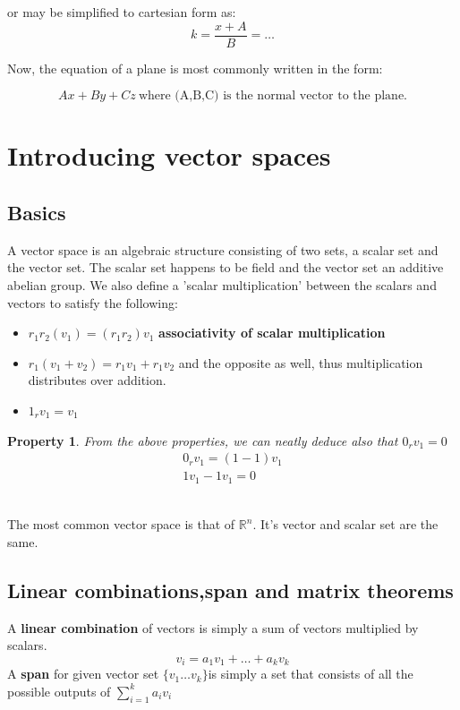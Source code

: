 \documentclass{article}
\newtheorem{property}{Property}
\begin{document}
or may be simplified to cartesian form as: 
\begin{equation*}
    k = \frac{x + A}{B} = \ldots
\end{equation*}

Now, the equation of a plane is most commonly written in the form: 

\begin{equation*}
    Ax + By + Cz \ \text{where (A,B,C) is the normal vector to the plane.}
\end{equation*}

\section{Introducing vector spaces}
\subsection{Basics}
A vector space is an algebraic structure consisting of two sets, a scalar set and the vector set. The scalar set happens to be field and the vector set an additive abelian group. We also define a 'scalar multiplication' between the scalars and vectors to satisfy the following:

\begin{itemize}
    \item $r_{1}r_{2}(v_{1}) = (r_{1}r_{2})v_{1}$  \textbf{associativity of scalar multiplication}
    \item $r_{1}(v_{1}+v_{2}) = r_{1}v_{1}+ r_{1}v_{2}$ and the opposite as well, thus multiplication distributes over addition.
    \item $1_{r}v_{1} = v_{1}$
\end{itemize}

\begin{property}
From the above properties, we can neatly deduce also that $0_{r}v_{1} = 0$
\begin{align*}
    0_{r}v_{1} = (1-1)v_{1}\\
    1v_{1} - 1v_{1} = 0
\end{align*}
\end{property}
\\
The most common vector space is that of $\mathbb{R}^{n}$. It's vector and scalar set are the same. 
\subsection{Linear combinations,span and matrix theorems}

\begin{tcolorbox}
  A \textbf{linear combination} of vectors is simply a sum of vectors multiplied by scalars. 
  \begin{equation*}
      v_{i} = a_{1}v_{1} + \ldots + a_{k}v_{k}
  \end{equation*}
  A \textbf{span} for given vector set $\{v_{1}\ldots v_{k}\}$is simply a set that consists of all the possible outputs of $\sum_{i=1}^{k} a_{i}v_{i}$
\end{tcolorbox}
\end{document}

